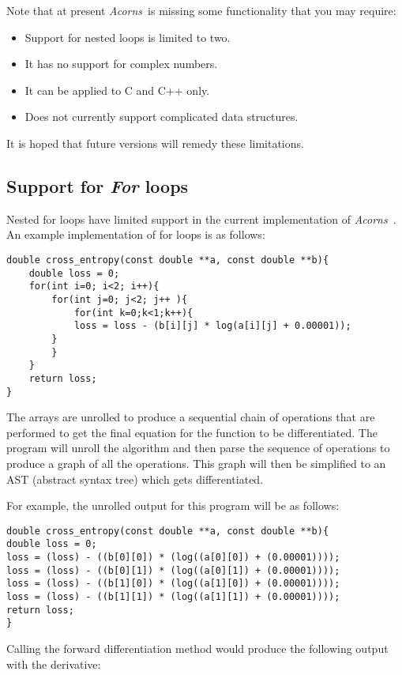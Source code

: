 \documentclass[a4,oneside]{book}
\def\Acorns{\emph{Acorns}}
\begin{document}
Note that at present \Acorns\ is missing some functionality that you may
require:

\begin{itemize}
\item Support for nested loops is limited to two.
\item It has no support for complex numbers.
\item It can be applied to C and C++ only.
\item Does not currently support complicated data structures.
\end{itemize}%
%
It is hoped that future versions will remedy these limitations.

\subsection{Support for \textit{For} loops}

Nested for loops have limited support in the current implementation of \Acorns\ . An example implementation of for loops is as follows:
\begin{lstlisting}
double cross_entropy(const double **a, const double **b){
	double loss = 0;
    for(int i=0; i<2; i++){
        for(int j=0; j<2; j++ ){
        	for(int k=0;k<1;k++){
            loss = loss - (b[i][j] * log(a[i][j] + 0.00001));
        }
        }
    }
    return loss;
}
\end{lstlisting}
The arrays are unrolled to produce a sequential chain of operations that are performed to get the final equation for the function to be differentiated. The program will unroll the algorithm and then parse the sequence of operations to produce a graph of all the operations. This graph will then be simplified to an AST (abstract syntax tree) which gets differentiated.

For example, the unrolled output for this program will be as follows:
\begin{lstlisting}
double cross_entropy(const double **a, const double **b){
double loss = 0;
loss = (loss) - ((b[0][0]) * (log((a[0][0]) + (0.00001))));
loss = (loss) - ((b[0][1]) * (log((a[0][1]) + (0.00001))));
loss = (loss) - ((b[1][0]) * (log((a[1][0]) + (0.00001))));
loss = (loss) - ((b[1][1]) * (log((a[1][1]) + (0.00001))));
return loss;
}
\end{lstlisting}

Calling the forward differentiation method would produce the following output with the derivative:
\end{document}
